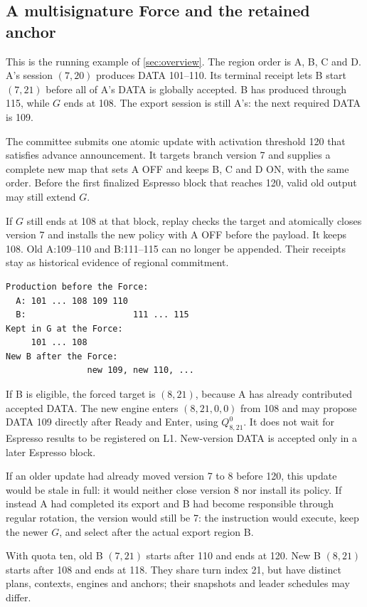 \documentclass[11pt,a4paper]{article}
\begin{document}
\subsection{A multisignature Force and the retained anchor}
\label{sec:force-example}
This is the running example of \cref{sec:overview}. The region order is
A, B, C and D. A's session $(7,20)$ produces DATA 101--110. Its terminal receipt
lets B start $(7,21)$ before all of A's DATA is globally accepted. B has
produced through 115, while $G$ ends at 108. The export session is still
A's: the next required DATA is 109.

The committee submits one atomic update with activation threshold 120
that satisfies advance announcement. It targets branch version 7 and
supplies a complete new map that sets A OFF and keeps B, C and D ON, with the same order.
Before the first finalized Espresso block that
reaches 120, valid old output may still extend $G$.

If $G$ still ends at 108 at that block, replay checks the target and
atomically closes version 7 and installs the new policy with A OFF before
the payload. It keeps 108. Old
A:109--110 and B:111--115 can no longer be appended. Their receipts stay
as historical evidence of regional commitment.

\begin{center}\small
\begin{verbatim}
Production before the Force:
  A: 101 ... 108 109 110
  B:                     111 ... 115
Kept in G at the Force:
     101 ... 108
New B after the Force:
                new 109, new 110, ...
\end{verbatim}
\end{center}

If B is eligible, the forced target is $(8,21)$, because A has already
contributed accepted DATA. The new engine enters $(8,21,0,0)$ from 108 and
may propose DATA 109 directly after Ready and Enter, using $Q^0_{8,21}$. It does not
wait for Espresso results to be registered on L1. New-version DATA is
accepted only in a later Espresso block.

If an older update had already moved version 7 to 8 before 120, this
update would be stale in full: it would neither close version 8 nor
install its policy. If instead A had completed its export and B had become
responsible through regular rotation, the version would still be 7: the
instruction would execute, keep the newer $G$, and select after the
actual export region B.

With quota ten, old B $(7,21)$ starts after 110 and ends at 120. New B
$(8,21)$ starts after 108 and ends at 118. They share turn index 21, but
have distinct plans, contexts, engines and anchors; their snapshots and
leader schedules may differ.
\end{document}
